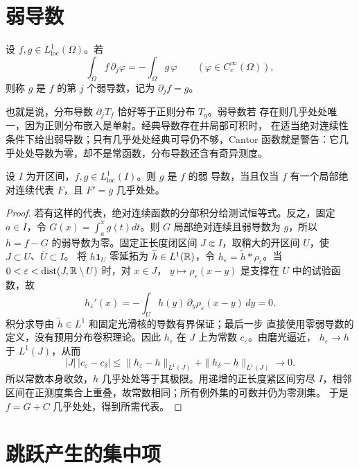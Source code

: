 \section{弱导数}

\begin{definition}
设 \(f,g\in L^1_{\mathrm{loc}}(\Omega)\)。若
\[
 \int_\Omega f\,\partial_j\varphi
 =-\int_\Omega g\,\varphi
 \qquad(\varphi\in C_c^\infty(\Omega)),
\]
则称 \(g\) 是 \(f\) 的第 \(j\) 个弱导数，记为 \(\partial_jf=g\)。
\end{definition}

也就是说，分布导数 \(\partial_jT_f\) 恰好等于正则分布 \(T_g\)。弱导数若
存在则几乎处处唯一，因为正则分布嵌入是单射。经典导数存在并局部可积时，
在适当绝对连续性条件下给出弱导数；只有几乎处处经典可导仍不够，Cantor
函数就是警告：它几乎处处导数为零，却不是常函数，分布导数还含有奇异测度。

\begin{theorem}[一维刻画]\label{thm:weak-derivative-ac-characterization}
设 \(I\) 为开区间，\(f,g\in L^1_{\mathrm{loc}}(I)\)。则 \(g\) 是 \(f\) 的弱
导数，当且仅当 \(f\) 有一个局部绝对连续代表 \(F\)，且
\(F'=g\) 几乎处处。
\end{theorem}
\begin{proof}
若有这样的代表，绝对连续函数的分部积分给测试恒等式。反之，固定
\(a\in I\)，令 \(G(x)=\int_a^xg(t)dt\)。则 \(G\) 局部绝对连续且弱导数为
\(g\)，所以 \(h=f-G\) 的弱导数为零。固定正长度闭区间
\(J\Subset I\)，取稍大的开区间 \(U\)，使 \(J\subset U\)、\(\overline U\subset I\)。
将 \(h\mathbf1_U\) 零延拓为 \(\widetilde h\in L^1(\mathbb{R})\)，令
\(h_\varepsilon=\widetilde h*\rho_\varepsilon\)。当
\(0<\varepsilon<\operatorname{dist}(J,\mathbb{R}\setminus U)\) 时，对 \(x\in J\)，
\(y\mapsto\rho_\varepsilon(x-y)\) 是支撑在 \(U\) 中的试验函数，故
\[
 h_\varepsilon'(x)
 =-\int_U h(y)\,\partial_y\rho_\varepsilon(x-y)\,dy=0.
\]
积分求导由 \(\widetilde h\in L^1\) 和固定光滑核的导数有界保证；最后一步
直接使用零弱导数的定义，没有预用分布卷积理论。因此 \(h_\varepsilon\) 在
\(J\) 上为常数 \(c_\varepsilon\)。由磨光逼近，
\(h_\varepsilon\to h\) 于 \(L^1(J)\)，从而
\[
 |J|\,|c_\varepsilon-c_\delta|
 \le\|h_\varepsilon-h\|_{L^1(J)}
   +\|h_\delta-h\|_{L^1(J)}\longrightarrow0.
\]
所以常数本身收敛，\(h\) 几乎处处等于其极限。用递增的正长度紧区间穷尽
\(I\)，相邻区间在正测度集合上重叠，故常数相同；所有例外集的可数并仍为零测集。
于是 \(f=G+C\) 几乎处处，得到所需代表。
\end{proof}

\section{跳跃产生的集中项}

